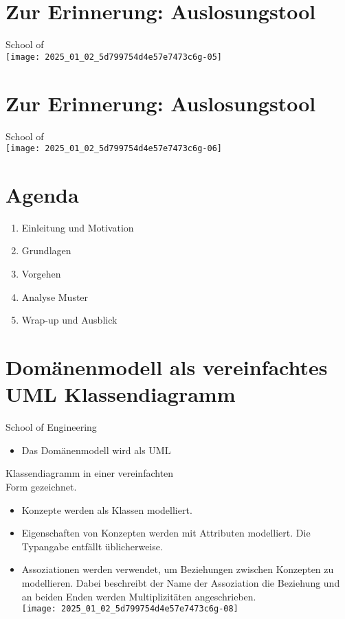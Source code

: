 \documentclass[10pt]{article}
\begin{document}
\section*{Zur Erinnerung: Auslosungstool}
School of\\
\texttt{[image: 2025\_01\_02\_5d799754d4e57e7473c6g-05]}

\section*{Zur Erinnerung: Auslosungstool}
School of\\
\texttt{[image: 2025\_01\_02\_5d799754d4e57e7473c6g-06]}

\section*{Agenda}
\begin{enumerate}
  \item Einleitung und Motivation
  \item Grundlagen
  \item Vorgehen
  \item Analyse Muster
  \item Wrap-up und Ausblick
\end{enumerate}

\section*{Domänenmodell als vereinfachtes UML Klassendiagramm}
School of Engineering

\begin{itemize}
  \item Das Domänenmodell wird als UML
\end{itemize}

Klassendiagramm in einer vereinfachten\\
Form gezeichnet.

\begin{itemize}
  \item Konzepte werden als Klassen modelliert.
  \item Eigenschaften von Konzepten werden mit Attributen modelliert. Die Typangabe entfällt üblicherweise.
  \item Assoziationen werden verwendet, um Beziehungen zwischen Konzepten zu modellieren. Dabei beschreibt der Name der Assoziation die Beziehung und an beiden Enden werden Multiplizitäten angeschrieben.\\
\texttt{[image: 2025\_01\_02\_5d799754d4e57e7473c6g-08]}
\end{itemize}
\end{document}
